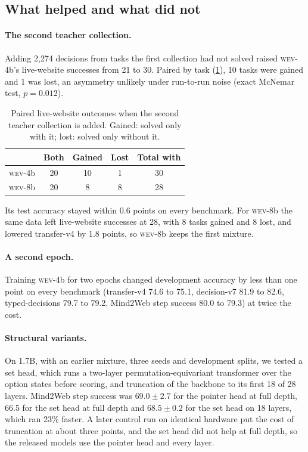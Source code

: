 \documentclass{article}
\newcommand{\wev}{\textsc{wev}\xspace}
\begin{document}
\subsection{What helped and what did not}
\label{sec:ablation}

\paragraph{The second teacher collection.} Adding 2{,}274 decisions from tasks the first collection had not solved
raised \wev-4b's live-website successes from 21 to 30. Paired by task (\cref{tab:paired}), 10 tasks were gained and 1
was lost, an asymmetry unlikely under run-to-run noise (exact McNemar test, $p=0.012$).

\begin{table}[t]
\centering
\caption{Paired live-website outcomes when the second teacher collection is added. Gained: solved only with it;
lost: solved only without it.}
\label{tab:paired}
\begin{tabular}{lcccc}
\toprule
 & Both & Gained & Lost & Total with \\
\midrule
\wev-4b & 20 & 10 & 1 & 30 \\
\wev-8b & 20 & 8 & 8 & 28 \\
\bottomrule
\end{tabular}
\end{table} Its test accuracy stayed within 0.6 points
on every benchmark. For \wev-8b the same data left live-website successes at 28, with 8 tasks gained and 8 lost, and
lowered transfer-v4 by 1.8 points, so \wev-8b keeps the first mixture.

\paragraph{A second epoch.} Training \wev-4b for two epochs changed development accuracy by less than one point on
every benchmark (transfer-v4 74.6 to 75.1, decision-v7 81.9 to 82.6, typed-decisions 79.7 to 79.2, Mind2Web step
success 80.0 to 79.3) at twice the cost.

\paragraph{Structural variants.} On 1.7B, with an earlier mixture, three seeds and development splits, we tested a set
head, which runs a two-layer permutation-equivariant transformer over the option states before scoring, and truncation
of the backbone to its first 18 of 28 layers. Mind2Web step success was $69.0\pm2.7$ for the pointer head at full
depth, 66.5 for the set head at full depth and $68.5\pm0.2$ for the set head on 18 layers, which ran 23\% faster. A later
control run on identical hardware put the cost of truncation at about three points, and the set head did not help at
full depth, so the released models use the pointer head and every layer.
\end{document}
